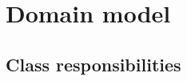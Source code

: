 \section{Domain model}
\begin{comment}
Give a high level view overview of the application using a UML diagram.
\end{comment}

\subsection{Class responsibilities}
\begin{comment}
Explanation of responsibilities of classes in diagram.
\end{comment}
